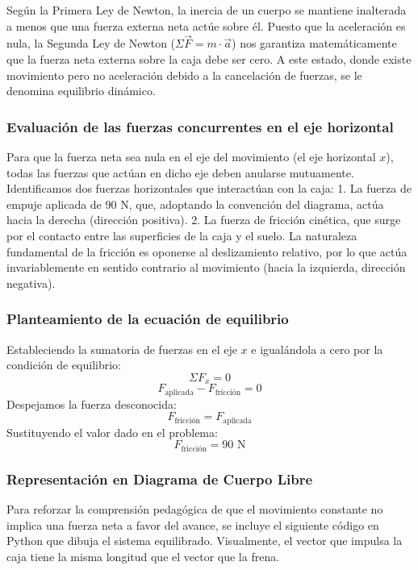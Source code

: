 \documentclass[12pt, a4paper]{article}
\begin{document}
Según la Primera Ley de Newton, la inercia de un cuerpo se mantiene inalterada a menos que una fuerza externa neta actúe sobre él. Puesto que la aceleración es nula, la Segunda Ley de Newton ($\Sigma\vec{F} = m \cdot \vec{a}$) nos garantiza matemáticamente que la fuerza neta externa sobre la caja debe ser cero. A este estado, donde existe movimiento pero no aceleración debido a la cancelación de fuerzas, se le denomina equilibrio dinámico.

\subsubsection*{Evaluación de las fuerzas concurrentes en el eje horizontal}
Para que la fuerza neta sea nula en el eje del movimiento (el eje horizontal $x$), todas las fuerzas que actúan en dicho eje deben anularse mutuamente. 
Identificamos dos fuerzas horizontales que interactúan con la caja:
1. La fuerza de empuje aplicada de $90 \text{ N}$, que, adoptando la convención del diagrama, actúa hacia la derecha (dirección positiva).
2. La fuerza de fricción cinética, que surge por el contacto entre las superficies de la caja y el suelo. La naturaleza fundamental de la fricción es oponerse al deslizamiento relativo, por lo que actúa invariablemente en sentido contrario al movimiento (hacia la izquierda, dirección negativa).

\subsubsection*{Planteamiento de la ecuación de equilibrio}
Estableciendo la sumatoria de fuerzas en el eje $x$ e igualándola a cero por la condición de equilibrio:
$$\Sigma F_x = 0$$
$$F_{\text{aplicada}} - F_{\text{fricción}} = 0$$
Despejamos la fuerza desconocida:
$$F_{\text{fricción}} = F_{\text{aplicada}}$$
Sustituyendo el valor dado en el problema:
$$F_{\text{fricción}} = 90 \text{ N}$$

\subsubsection*{Representación en Diagrama de Cuerpo Libre}
Para reforzar la comprensión pedagógica de que el movimiento constante no implica una fuerza neta a favor del avance, se incluye el siguiente código en Python que dibuja el sistema equilibrado. Visualmente, el vector que impulsa la caja tiene la misma longitud que el vector que la frena.
\end{document}
